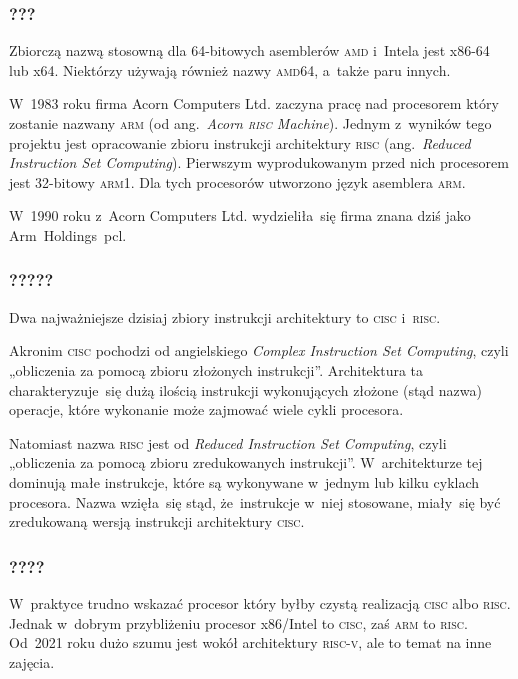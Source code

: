 \documentclass[10pt,t]{beamer}
\begin{document}
\begin{frame}
  \frametitle{???}


  Zbiorczą nazwą stosowną dla 64-bitowych asemblerów \textsc{amd} i~Intela
  jest \alert{x86-64} lub \alert{x64}. Niektórzy używają również nazwy
  \alert{\textsc{amd}64}, a~także paru innych.

  W~1983 roku firma Acorn Computers Ltd. zaczyna pracę nad procesorem który
  zostanie nazwany \alert{\textsc{arm}} (od ang.~\textit{Acorn \textsc{risc}
    Machine}). Jednym z~wyników tego projektu jest opracowanie zbioru
  instrukcji architektury \textsc{risc} (ang.~\textit{Reduced Instruction
    Set Computing}). Pierwszym wyprodukowanym przed nich procesorem jest
  32-bitowy \textsc{arm1}. Dla tych procesorów utworzono język asemblera
  \alert{\textsc{arm}}.

  W~1990 roku z~Acorn Computers Ltd. wydzieliła~się firma znana dziś jako
  Arm~Holdings~pcl.

\end{frame}





\begin{frame}
  \frametitle{?????}


  Dwa najważniejsze dzisiaj zbiory instrukcji architektury to
  \alert{\textsc{cisc}} i~\alert{\textsc{risc}}.

  Akronim \textsc{cisc} pochodzi od angielskiego \textit{Complex
    Instruction Set Computing}, czyli „obliczenia za pomocą zbioru
  złożonych instrukcji”. Architektura ta charakteryzuje~się dużą ilością
  instrukcji wykonujących złożone (stąd nazwa) operacje, które wykonanie
  może zajmować wiele cykli procesora.

  Natomiast nazwa \textsc{risc} jest od \textit{Reduced Instruction Set
    Computing}, czyli „obliczenia za pomocą zbioru zredukowanych
  instrukcji”. W~architekturze tej dominują małe instrukcje, które są
  wykonywane w~jednym lub kilku cyklach procesora. Nazwa wzięła~się
  stąd, że~instrukcje w~niej stosowane, miały~się być zredukowaną wersją
  instrukcji architektury \textsc{cisc}.

\end{frame}





\begin{frame}
  \frametitle{????}


  W~praktyce trudno wskazać procesor który byłby czystą realizacją
  \textsc{cisc} albo \textsc{risc}. Jednak w~dobrym przybliżeniu procesor
  x86/Intel to \textsc{cisc}, zaś \textsc{arm} to \textsc{risc}. Od~2021
  roku dużo szumu jest wokół architektury \textsc{risc-v}, ale to temat na
  inne zajęcia.

\end{frame}
\end{document}
